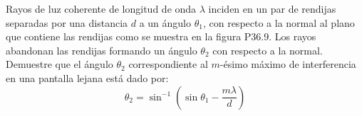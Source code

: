 \item Rayos de luz coherente de longitud de onda $\lambda$ inciden en un par de rendijas separadas por una distancia $d$ a un ángulo $\theta_1$, con respecto a la normal al plano que contiene las rendijas como se muestra en la figura P36.9. Los rayos abandonan las rendijas formando un ángulo $\theta_2$ con respecto a la normal. Demuestre que el ángulo $\theta_2$ correspondiente al $m$-ésimo máximo de interferencia en una pantalla lejana está dado por:
$$ \theta_2 = \sin^{-1} \left( \sin\theta_1 - \frac{m\lambda}{d} \right) $$